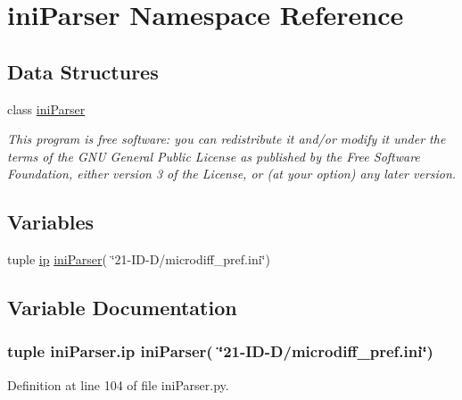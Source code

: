 \hypertarget{namespaceiniParser}{\section{ini\-Parser Namespace Reference}
\label{namespaceiniParser}
}
\subsection*{Data Structures}
\begin{DoxyCompactItemize}
\item 
class \hyperlink{classiniParser_1_1iniParser}{ini\-Parser}
\begin{DoxyCompactList}\small\item\em This program is free software\-: you can redistribute it and/or modify it under the terms of the G\-N\-U General Public License as published by the Free Software Foundation, either version 3 of the License, or (at your option) any later version. \end{DoxyCompactList}\end{DoxyCompactItemize}
\subsection*{Variables}
\begin{DoxyCompactItemize}
\item 
tuple \hyperlink{namespaceiniParser_ac1ed4e851042909f1667bbf67fb9b8d7}{ip} \hyperlink{classiniParser_1_1iniParser}{ini\-Parser}( \char`\"{}21-\/I\-D-\/D/microdiff\-\_\-pref.\-ini\char`\"{})
\end{DoxyCompactItemize}


\subsection{Variable Documentation}
\hypertarget{namespaceiniParser_ac1ed4e851042909f1667bbf67fb9b8d7}{
\subsubsection[{ip}]{\setlength{\rightskip}{0pt plus 5cm}tuple ini\-Parser.\-ip {\bf ini\-Parser}( \char`\"{}21-\/I\-D-\/D/microdiff\-\_\-pref.\-ini\char`\"{})}}\label{namespaceiniParser_ac1ed4e851042909f1667bbf67fb9b8d7}


Definition at line 104 of file ini\-Parser.\-py.

